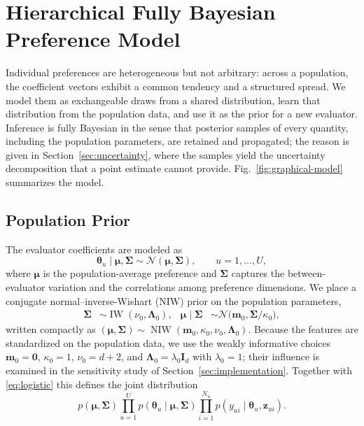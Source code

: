 \documentclass[lettersize,journal]{IEEEtran}
\newcommand{\Normal}{\mathcal{N}}
\newcommand{\IW}{\operatorname{IW}}
\newcommand{\NIW}{\operatorname{NIW}}
\begin{document}
\section{Hierarchical Fully Bayesian Preference Model}
\label{sec:model}

Individual preferences are heterogeneous but not arbitrary: across a population, the coefficient vectors exhibit a common tendency and a structured spread. We model them as exchangeable draws from a shared distribution, learn that distribution from the population data, and use it as the prior for a new evaluator. Inference is fully Bayesian in the sense that posterior samples of every quantity, including the population parameters, are retained and propagated; the reason is given in Section~\ref{sec:uncertainty}, where the samples yield the uncertainty decomposition that a point estimate cannot provide. Fig.~\ref{fig:graphical-model} summarizes the model.

\subsection{Population Prior}
\label{sec:prior}

The evaluator coefficients are modeled as
\begin{equation}
 \bm\theta_u\mid\bm\mu,\bm\Sigma\sim\Normal(\bm\mu,\bm\Sigma),\qquad u=1,\ldots,U,
 \label{eq:population}
\end{equation}
where $\bm\mu$ is the population-average preference and $\bm\Sigma$ captures the between-evaluator variation and the correlations among preference dimensions. We place a conjugate normal--inverse-Wishart (NIW) prior on the population parameters,
\begin{align}
 \bm\Sigma&\sim\IW(\nu_0,\bm\Lambda_0), &
 \bm\mu\mid\bm\Sigma&\sim\Normal\!\big(\bm m_0,\bm\Sigma/\kappa_0\big),
 \label{eq:niw}
\end{align}
written compactly as $(\bm\mu,\bm\Sigma)\sim\NIW(\bm m_0,\kappa_0,\nu_0,\bm\Lambda_0)$. Because the features are standardized on the population data, we use the weakly informative choices $\bm m_0=\bm 0$, $\kappa_0=1$, $\nu_0=d+2$, and $\bm\Lambda_0=\lambda_0\bm I_d$ with $\lambda_0=1$; their influence is examined in the sensitivity study of Section~\ref{sec:implementation}. Together with \eqref{eq:logistic} this defines the joint distribution
\begin{equation}
 p(\bm\mu,\bm\Sigma)\prod_{u=1}^{U}p(\bm\theta_u\mid\bm\mu,\bm\Sigma)\prod_{i=1}^{N_u}p(y_{ui}\mid\bm\theta_u,\bm z_{ui}).
 \label{eq:joint}
\end{equation}
\end{document}
